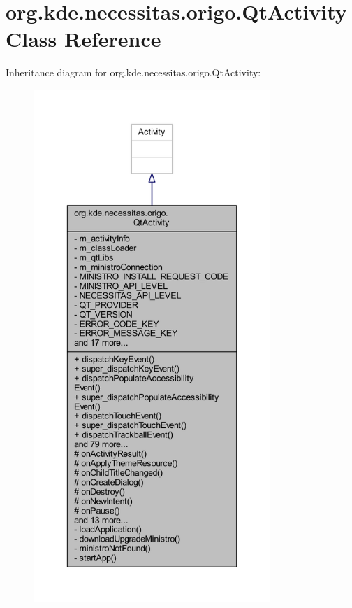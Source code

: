\hypertarget{classorg_1_1kde_1_1necessitas_1_1origo_1_1_qt_activity}{\section{org.\-kde.\-necessitas.\-origo.\-Qt\-Activity Class Reference}
\label{db/d37/classorg_1_1kde_1_1necessitas_1_1origo_1_1_qt_activity}
}


Inheritance diagram for org.\-kde.\-necessitas.\-origo.\-Qt\-Activity\-:\nopagebreak
\begin{figure}[H]
\begin{center}
\leavevmode
\includegraphics[height=550pt]{d8/d74/classorg_1_1kde_1_1necessitas_1_1origo_1_1_qt_activity__inherit__graph}
\end{center}
\end{figure}


